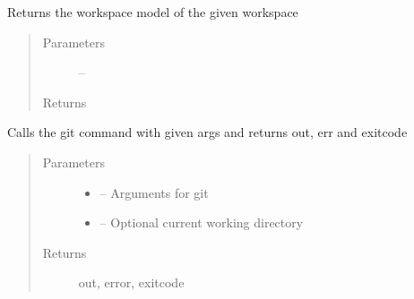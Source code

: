 \documentclass[letterpaper,10pt,english]{sphinxmanual}
\begin{document}

\begin{fulllineitems}
\label{_source/son_editor.impl:son_editor.impl.gitimpl.get_workspace}
Returns the workspace model of the given workspace
\begin{quote}\begin{description}
\item[{Parameters}] \leavevmode
{} -- 

\item[{Returns}] \leavevmode


\end{description}\end{quote}

\end{fulllineitems}


\begin{fulllineitems}
\label{_source/son_editor.impl:son_editor.impl.gitimpl.git_command}
Calls the git command with given args and returns out, err and exitcode
\begin{quote}\begin{description}
\item[{Parameters}] \leavevmode\begin{itemize}
\item {} 
 -- Arguments for git

\item {} 
 -- Optional current working directory

\end{itemize}

\item[{Returns}] \leavevmode
out, error, exitcode

\end{description}\end{quote}

\end{fulllineitems}

\end{document}
